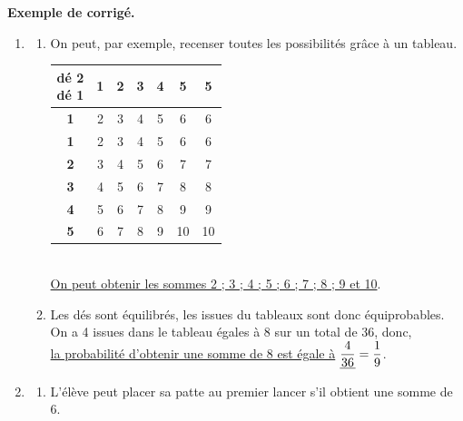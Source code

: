 \begin{activite}
   
   \textcolor{G1}{
   {\bf Exemple de corrigé.} \smallskip
      \begin{enumerate}
         \item
             \begin{enumerate}
                \item On peut, par exemple, recenser toutes les possibilités grâce à un tableau. \\ [1mm]
                   {
                   \begin{tabular}{|*{7}{C{0.5}|}}
                      \hline
                      \parbox{8mm}{{\footnotesize \hfill dé 2 \\ [-1mm] dé 1}} & \bf 1 & \bf 2 & \bf 3 & \bf 4 & \bf 5 & \bf 5 \\
                      \hline
                      \bf 1 & 2 & 3 & 4 & 5 & 6 & 6 \\
                      \hline
                      \bf 1 & 2 & 3 & 4 & 5 & 6 & 6 \\
                      \hline
                      \bf 2 & 3 & 4 & 5 & 6 & 7 & 7 \\
                      \hline
                      \bf 3 & 4 & 5 & 6 & 7 & 8 & 8 \\
                      \hline
                      \bf 4 & 5 & 6 & 7 & 8 & 9 & 9 \\
                      \hline
                      \bf 5 & 6 & 7 & 8 & 9 & 10 & 10 \\
                      \hline
                   \end{tabular}} \\ [2mm]
                   \uline{On peut obtenir les sommes 2 ; 3 ; 4 ; 5 ; 6 ; 7 ; 8 ; 9 et 10}.    
               \item Les dés sont équilibrés, les issues du tableaux sont donc équiprobables. \\
                  On a 4 issues dans le tableau égales à 8 sur un total de 36, donc, \\ [1mm]
                  \uline{la probabilité d'obtenir une somme de 8 est égale à} $\uline{\dfrac{4}{36}} =\dfrac19$. \smallskip
            \end{enumerate}    
         \item
            \begin{enumerate}
               \item L'élève peut placer sa patte au premier lancer s'il obtient une somme de 6. \\

\end{enumerate}
\end{enumerate}}
\end{activite}
